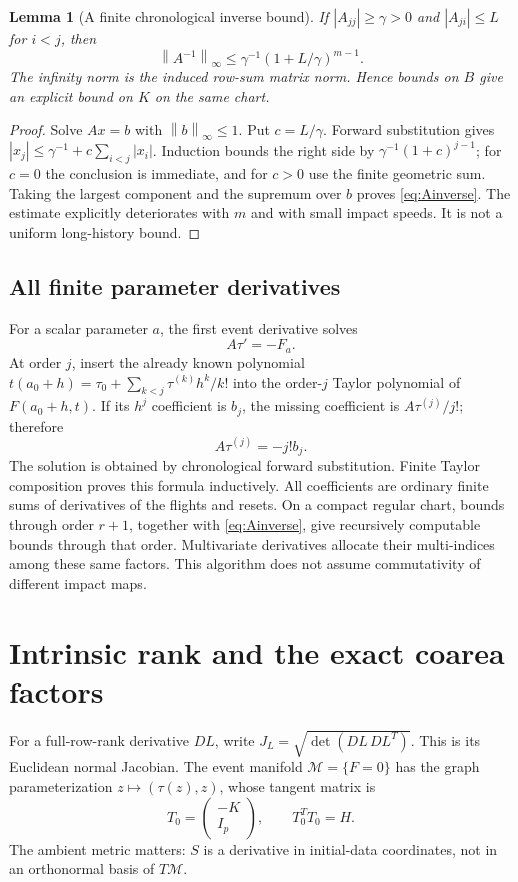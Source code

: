 \documentclass[11pt,reqno]{amsart}
\numberwithin{equation}{section}
\newtheorem{lemma}[theorem]{Lemma}
\theoremstyle{remark}\newtheorem{remark}[theorem]{Remark}
\newcommand{\norm}[1]{\left\lVert #1\right\rVert}
\begin{document}
\begin{lemma}[A finite chronological inverse bound]\label{lem:inverse}
If $|A_{jj}|\ge\gamma>0$ and $|A_{ji}|\le L$ for $i<j$, then
\begin{equation}\label{eq:Ainverse}
 \norm{A^{-1}}_\infty\le\gamma^{-1}(1+L/\gamma)^{m-1}.
\end{equation}
The infinity norm is the induced row-sum matrix norm. Hence bounds on $B$ give an explicit bound on $K$ on the same chart.
\end{lemma}
\begin{proof}
Solve $Ax=b$ with $\norm b_\infty\le1$. Put $c=L/\gamma$. Forward substitution gives
$|x_j|\le\gamma^{-1}+c\sum_{i<j}|x_i|$.
Induction bounds the right side by $\gamma^{-1}(1+c)^{j-1}$; for $c=0$ the conclusion is immediate, and for $c>0$ use the finite geometric sum. Taking the largest component and the supremum over $b$ proves \eqref{eq:Ainverse}. The estimate explicitly deteriorates with $m$ and with small impact speeds. It is not a uniform long-history bound.
\end{proof}

\subsection{All finite parameter derivatives}
For a scalar parameter $a$, the first event derivative solves
\[
 A\tau'=-F_a.
\]
At order $j$, insert the already known polynomial
$t(a_0+h)=\tau_0+\sum_{k<j}\tau^{(k)}h^k/k!$
into the order-$j$ Taylor polynomial of $F(a_0+h,t)$. If its $h^j$ coefficient is $b_j$, the missing coefficient is $A\tau^{(j)}/j!$; therefore
\begin{equation}\label{eq:jet}
 A\tau^{(j)}=-j!b_j.
\end{equation}
The solution is obtained by chronological forward substitution. Finite Taylor composition proves this formula inductively. All coefficients are ordinary finite sums of derivatives of the flights and resets. On a compact regular chart, bounds through order $r+1$, together with \eqref{eq:Ainverse}, give recursively computable bounds through that order. Multivariate derivatives allocate their multi-indices among these same factors. This algorithm does not assume commutativity of different impact maps.

\section{Intrinsic rank and the exact coarea factors}
For a full-row-rank derivative $DL$, write $J_L=\sqrt{\det(DL\,DL^T)}$. This is its Euclidean normal Jacobian. The event manifold $\mathcal M=\{F=0\}$ has the graph parameterization $z\mapsto(\tau(z),z)$, whose tangent matrix is
\[
 T_0=\begin{pmatrix}-K\\I_p\end{pmatrix},\qquad T_0^TT_0=H.
\]
The ambient metric matters: $S$ is a derivative in initial-data coordinates, not in an orthonormal basis of $T\mathcal M$.
\end{document}
